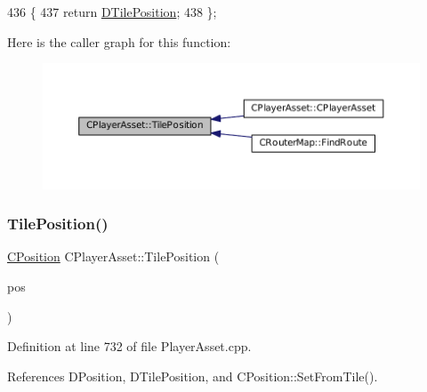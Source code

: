 \begin{DoxyCode}
436                                       \{
437             \textcolor{keywordflow}{return} \hyperlink{classCPlayerAsset_a5b59a9d3b7db8c7fa194b80dafb96186}{DTilePosition};  
438         \};
\end{DoxyCode}
Here is the caller graph for this function\+:\nopagebreak
\begin{figure}[H]
\begin{center}
\leavevmode
\includegraphics[width=350pt]{classCPlayerAsset_a23354232e5585574bc8e12c1fdb37ad9_icgraph}
\end{center}
\end{figure}
\hypertarget{classCPlayerAsset_a6d84105b6db136a6846fcaf80dba3747}{}\label{classCPlayerAsset_a6d84105b6db136a6846fcaf80dba3747} 
\subsubsection{\texorpdfstring{Tile\+Position()}{TilePosition()}\hspace{0.1cm}{\footnotesize\ttfamily [2/2]}}
{\footnotesize\ttfamily \hyperlink{classCPosition}{C\+Position} C\+Player\+Asset\+::\+Tile\+Position (\begin{DoxyParamCaption}\item[{const \hyperlink{classCPosition}{C\+Position} \&}]{pos }\end{DoxyParamCaption})}



Definition at line 732 of file Player\+Asset.\+cpp.



References D\+Position, D\+Tile\+Position, and C\+Position\+::\+Set\+From\+Tile().


